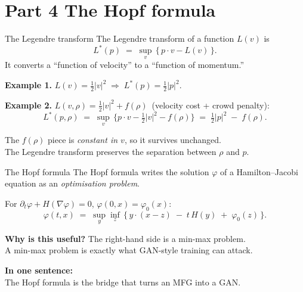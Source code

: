 \documentclass[10pt,aspectratio=169]{beamer}
\newcommand{\teal}[1]{\textcolor{kaustteal}{#1}}
\newcommand{\blue}[1]{\textcolor{kaustblue}{#1}}
\begin{document}
\section{Part 4 \;\textbar\; The Hopf formula}

\begin{frame}{The Legendre transform}
The \blue{Legendre transform} of a function $L(v)$ is
\[
  L^*(p) \;=\; \sup_v\,\{\,p\cdot v - L(v)\,\}.
\]
It converts a ``function of velocity'' to a ``function of momentum.''

\medskip
\textbf{Example 1.}  $L(v) = \tfrac12|v|^2 \;\Longrightarrow\; L^*(p) = \tfrac12|p|^2$.

\textbf{Example 2.}  $L(v,\rho) = \tfrac12|v|^2 + f(\rho)$ \;\,(velocity cost + crowd penalty):
\[
  L^*(p,\rho) \;=\; \sup_v\,\bigl\{p\!\cdot\!v - \tfrac12|v|^2 - f(\rho)\bigr\}
  \;=\; \tfrac12|p|^2 \;-\; f(\rho).
\]

\medskip
\begin{recap}[title=Crucial observation]
The $f(\rho)$ piece is \emph{constant in $v$}, so it survives unchanged.\\
The Legendre transform \alert{preserves the separation} between $\rho$ and $p$.
\end{recap}
\end{frame}

\begin{frame}{The Hopf formula}
The \blue{Hopf formula} writes the solution $\varphi$ of a Hamilton--Jacobi
equation as an \emph{optimisation problem}.

\medskip
For $\partial_t\varphi + H(\nabla\varphi) = 0$, $\varphi(0,x)=\varphi_0(x)$:
\[
  \varphi(t,x) \;=\; \sup_y \inf_z\,
  \bigl\{\, y\!\cdot\!(x-z) \;-\; t\,H(y) \;+\; \varphi_0(z)\,\bigr\}.
\]

\medskip
\textbf{Why is this useful?}  The right-hand side is a \alert{min-max} problem.\\
A min-max problem is exactly what GAN-style training can attack.

\medskip
\textbf{In one sentence:}\\
\teal{The Hopf formula is the bridge that turns an MFG into a GAN.}
\end{frame}
\end{document}
